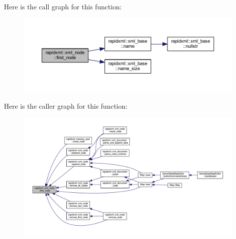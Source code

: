 Here is the call graph for this function\+:
\nopagebreak
\begin{figure}[H]
\begin{center}
\leavevmode
\includegraphics[width=350pt]{singletonrapidxml_1_1xml__node_a2dedeb4e04bb35e06a9a7bddf6ba652d_cgraph}
\end{center}
\end{figure}




Here is the caller graph for this function\+:
\nopagebreak
\begin{figure}[H]
\begin{center}
\leavevmode
\includegraphics[width=350pt]{singletonrapidxml_1_1xml__node_a2dedeb4e04bb35e06a9a7bddf6ba652d_icgraph}
\end{center}
\end{figure}


